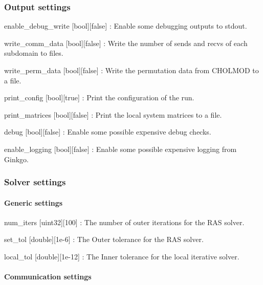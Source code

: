 \subsubsection*{Output settings}


\begin{DoxyItemize}
\item {\ttfamily enable\+\_\+debug\+\_\+write} \mbox{[}bool\mbox{]}\mbox{[}false\mbox{]} \+: Enable some debugging outputs to stdout.
\item {\ttfamily write\+\_\+comm\+\_\+data} \mbox{[}bool\mbox{]}\mbox{[}false\mbox{]} \+: Write the number of sends and recvs of each subdomain to files.
\item {\ttfamily write\+\_\+perm\+\_\+data} \mbox{[}bool\mbox{]}\mbox{[}false\mbox{]} \+: Write the permutation data from C\+H\+O\+L\+M\+OD to a file.
\item {\ttfamily print\+\_\+config} \mbox{[}bool\mbox{]}\mbox{[}true\mbox{]} \+: Print the configuration of the run.
\item {\ttfamily print\+\_\+matrices} \mbox{[}bool\mbox{]}\mbox{[}false\mbox{]} \+: Print the local system matrices to a file.
\item {\ttfamily debug} \mbox{[}bool\mbox{]}\mbox{[}false\mbox{]} \+: Enable some possible expensive debug checks.
\item {\ttfamily enable\+\_\+logging} \mbox{[}bool\mbox{]}\mbox{[}false\mbox{]} \+: Enable some possible expensive logging from Ginkgo.
\end{DoxyItemize}

\subsubsection*{Solver settings}

\paragraph*{Generic settings}


\begin{DoxyItemize}
\item {\ttfamily num\+\_\+iters} \mbox{[}uint32\mbox{]}\mbox{[}100\mbox{]} \+: The number of outer iterations for the R\+AS solver.
\item {\ttfamily set\+\_\+tol} \mbox{[}double\mbox{]}\mbox{[}1e-\/6\mbox{]} \+: The Outer tolerance for the R\+AS solver.
\item {\ttfamily local\+\_\+tol} \mbox{[}double\mbox{]}\mbox{[}1e-\/12\mbox{]} \+: The Inner tolerance for the local iterative solver. \paragraph*{Communication settings}
\end{DoxyItemize}


